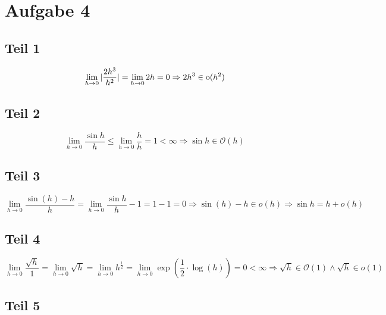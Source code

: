 \documentclass[10pt,a4paper]{article}
\begin{document}
\section{Aufgabe 4}

\subsection{Teil 1}

\begin{equation}
  \lim_{h \rightarrow 0} |\frac{2h^{3}}{h^{2}}| = \lim_{h \rightarrow 0} 2h = 0 \Rightarrow 2h^{3} \in \hbox{o}(h^{2})
\end{equation}

\subsection{Teil 2}

\begin{equation}
  \lim_{h \rightarrow 0} \frac{\sin h}{h} \le \lim_{h \rightarrow 0} \frac{h}{h} = 1 < \infty \Rightarrow \sin h \in \mathcal{O}(h)
\end{equation}

\subsection{Teil 3}

\begin{equation}
  \lim_{h \rightarrow 0} \frac{\sin(h) - h}{h} = \lim_{h \rightarrow 0} \frac{\sin h}{h} - 1 = 1 - 1 = 0 \Rightarrow \sin(h) - h \in o(h) \Rightarrow \sin h = h + o(h)
\end{equation}

\subsection{Teil 4}

\begin{equation}
  \lim_{h \rightarrow 0} \frac{\sqrt{h}}{1} = \lim_{h \rightarrow 0} \sqrt{h} = \lim_{h \rightarrow 0} h^{\frac{1}{2}} = \lim_{h \rightarrow 0} \exp(\frac{1}{2} \cdot \log(h)) = 0 < \infty \Rightarrow \sqrt{h} \in \mathcal{O}(1) \land \sqrt{h} \in o(1)
\end{equation}

\subsection{Teil 5}
\end{document}
